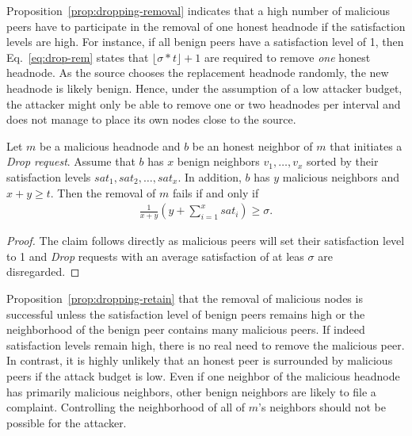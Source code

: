 Proposition~\ref{prop:dropping-removal} indicates that a high number of malicious peers have to participate in the removal of one honest headnode if the satisfaction levels are high. 
For instance, if all benign peers have a satisfaction level of 1, then Eq.~\ref{eq:drop-rem} states that $\lfloor \sigma*t \rfloor +1$ are required to remove \emph{one} honest headnode. As the source chooses the replacement headnode  randomly, the new headnode is likely benign. Hence, under the assumption of a low attacker budget, the attacker might only be able to remove one or two headnodes per interval and does not manage to place its own nodes close to the source. 

\begin{proposition}
\label{prop:dropping-retain}
Let $m$ be a malicious headnode and $b$ be an honest neighbor of $m$ that initiates a \textit{Drop request}.
Assume that $b$ has $x$ benign neighbors $v_1, \ldots , v_x$ sorted by their satisfaction levels $sat_1, sat_2 ,\ldots  , sat_x$. In addition, $b$ has $y$ malicious neighbors and $x+y\geq t$.
 Then the removal of $m$ fails if and only if 
\begin{align}
\label{eq:drop-retain}
\frac{1}{x+y}\left(y+\sum_{i=1}^x sat_i\right) \geq \sigma.  
\end{align} 
\end{proposition}
\begin{proof}
The claim follows directly as malicious peers will set their satisfaction level to 1 and \textit{Drop} requests with an average satisfaction of at leas $\sigma$ are disregarded.  
\end{proof}

Proposition~\ref{prop:dropping-retain} that the removal of malicious nodes is successful unless the satisfaction level of benign peers remains high or the neighborhood of the benign peer contains many malicious peers. 
If indeed satisfaction levels remain high, there is no real need to remove the malicious peer. In contrast, it is highly unlikely that an honest peer is surrounded by malicious peers if the attack budget is low. Even if one neighbor of the malicious headnode has primarily malicious neighbors, other benign neighbors are likely to file a complaint. Controlling the neighborhood of all of $m$'s neighbors should not be possible for the attacker. 
 